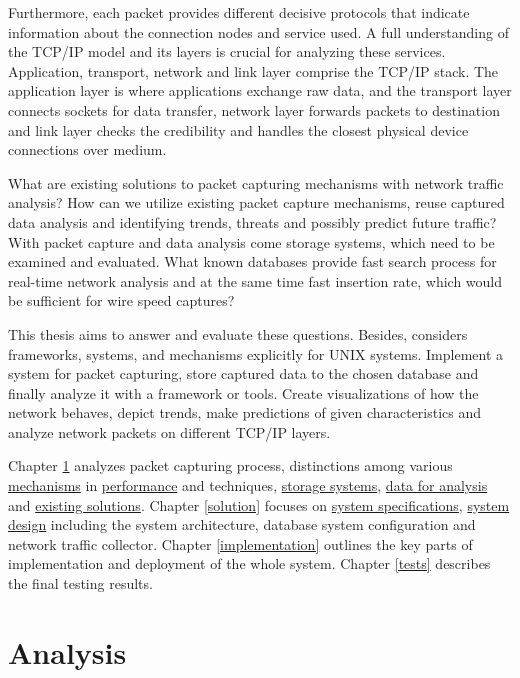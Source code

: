 \documentclass[12pt,a4paper,twoside]{book}
\begin{document}
    Furthermore, each packet provides different decisive protocols that indicate information about the connection nodes and service used. A full understanding of the TCP/IP model and its layers is crucial for analyzing these services. Application, transport, network and link layer comprise the TCP/IP stack. The application layer is where applications exchange raw data, and the transport layer connects sockets for data transfer, network layer forwards packets to destination and link layer checks the credibility and handles the closest physical device connections over medium.\par
    What are existing solutions to packet capturing mechanisms with network traffic analysis? How can we utilize existing packet capture mechanisms, reuse captured data analysis and identifying trends, threats and possibly predict future traffic? With packet capture and data analysis come storage systems, which need to be examined and evaluated. What known databases provide fast search process for real-time network analysis and at the same time fast insertion rate, which would be sufficient for wire speed captures?\par
    This thesis aims to answer and evaluate these questions. Besides, considers frameworks, systems, and mechanisms explicitly for UNIX systems. Implement a system for packet capturing, store captured data to the chosen database and finally analyze it with a framework or tools. Create visualizations of how the network behaves, depict trends, make predictions of given characteristics and analyze network packets on different TCP/IP layers.\par
    Chapter \ref{analysis} analyzes packet capturing process, distinctions among various \hyperref[analysis:mechs]{mechanisms} in \hyperref[analysis:testing]{performance} and techniques, \hyperref[analysis:storage]{storage systems}, \hyperref[analysis:data]{data for analysis} and  \hyperref[analysis:solutions]{existing solutions}. Chapter \ref{solution} focuses on \hyperref[solution:spec]{system specifications}, \hyperref[solution:design]{system design} including the system architecture, database system configuration and network traffic collector. Chapter \ref{implementation} outlines the key parts of implementation and deployment of the whole system. Chapter \ref{tests} describes the final testing results.
\chapter{Analysis} \label{analysis}
\end{document}
